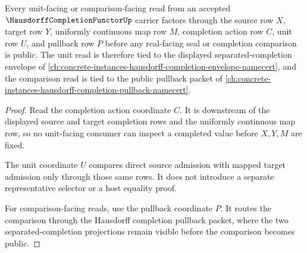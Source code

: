 \begin{theorem}
\label{thm:hausdorff-completion-functor-unit-pullback-route}
Every unit-facing or comparison-facing read from an accepted $\HausdorffCompletionFunctorUp$ carrier factors through the source row $X$, target row $Y$, uniformly continuous map row $M$, completion action row $C$, unit row $U$, and pullback row $P$ before any real-facing seal or completion comparison is public. The unit read is therefore tied to the displayed separated-completion envelope of \autoref{ch:concrete-instances-hausdorff-completion-envelope-namecert}, and the comparison read is tied to the public pullback packet of \autoref{ch:concrete-instances-hausdorff-completion-pullback-namecert}.
\end{theorem}
\begin{proof}
Read the completion action coordinate $C$. It is downstream of the displayed source and target completion rows and the uniformly continuous map row, so no unit-facing consumer can inspect a completed value before $X,Y,M$ are fixed.

The unit coordinate $U$ compares direct source admission with mapped target admission only through those same rows. It does not introduce a separate representative selector or a host equality proof.

For comparison-facing reads, use the pullback coordinate $P$. It routes the comparison through the Hausdorff completion pullback packet, where the two separated-completion projections remain visible before the comparison becomes public.
\end{proof}

